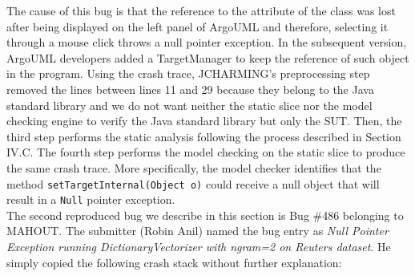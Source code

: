 \documentclass[times]{smrauth}
\begin{document}
The cause of this bug is that the reference to the attribute of
the class was lost after being displayed on the left panel of
ArgoUML and therefore, selecting it through a mouse click
throws a null pointer exception. In the subsequent version,
ArgoUML developers added a TargetManager to keep the
reference of such object in the program. Using the crash trace, JCHARMING's preprocessing step
removed the lines between lines 11 and 29 because they
belong to the Java standard library and we do not want neither
the static slice nor the model checking engine to verify the
Java standard library but only the SUT. Then, the third step
performs the static analysis following the process described in
Section IV.C. The fourth step performs the model checking on
the static slice to produce the same crash trace. More
specifically, the model checker identifies that the method
{\tt setTargetInternal(Object o)} could receive a null object that
will result in a {\tt Null} pointer exception. \\

The second reproduced bug we describe in this section is Bug \#486 belonging to MAHOUT. The submitter (Robin Anil) named the bug entry as {\it Null Pointer Exception running DictionaryVectorizer with ngram=2 on Reuters dataset}. He simply copied the following crash stack without further explanation:

\vspace*{0.3cm}
\end{document}
